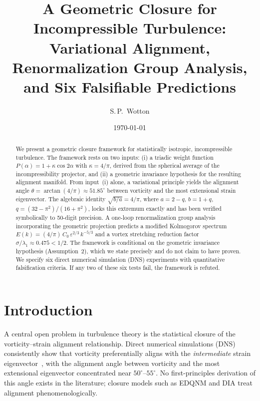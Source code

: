 \documentclass[12pt,a4paper]{article}
\begin{document}
\title{A Geometric Closure for Incompressible Turbulence:\\
Variational Alignment, Renormalization Group Analysis,\\
and Six Falsifiable Predictions}

\author{S.\,P.\ Wotton}

\date{\today}

\begin{abstract}
We present a geometric closure framework for statistically isotropic, incompressible turbulence.
The framework rests on two inputs: (i) a triadic weight function $P(\alpha) = 1 + \kappa\cos 2\alpha$ with $\kappa = 4/\pi$, derived from the spherical average of the incompressibility projector, and (ii) a geometric invariance hypothesis for the resulting alignment manifold.
From input~(i) alone, a variational principle yields the alignment angle $\theta = \arctan(4/\pi) \approx 51.85^\circ$ between vorticity and the most extensional strain eigenvector.
The algebraic identity $\sqrt{b/a} = 4/\pi$, where $a = 2 - q$, $b = 1 + q$, $q = (32 - \pi^2)/(16 + \pi^2)$, locks this extremum exactly and has been verified symbolically to 50-digit precision.
A one-loop renormalization group analysis incorporating the geometric projection predicts a modified Kolmogorov spectrum $E(k) = (4/\pi)\,C_0\,\varepsilon^{2/3}\,k^{-5/3}$ and a vortex stretching reduction factor $\sigma/\lambda_1 \approx 0.475 < 1/2$.
The framework is conditional on the geometric invariance hypothesis (Assumption~2), which we state precisely and do not claim to have proven.
We specify six direct numerical simulation (DNS) experiments with quantitative falsification criteria.
If any two of these six tests fail, the framework is refuted.
\end{abstract}

\maketitle

\section{Introduction}
\label{sec:intro}

A central open problem in turbulence theory is the statistical closure of the vorticity--strain alignment relationship.
Direct numerical simulations (DNS) consistently show that vorticity preferentially aligns with the \emph{intermediate} strain eigenvector~\cite{Ashurst1987,Tsinober1992,Hamlington2008}, with the alignment angle between vorticity and the most extensional eigenvector concentrated near $50^\circ$--$55^\circ$.
No first-principles derivation of this angle exists in the literature; closure models such as EDQNM and DIA treat alignment phenomenologically.
\end{document}
